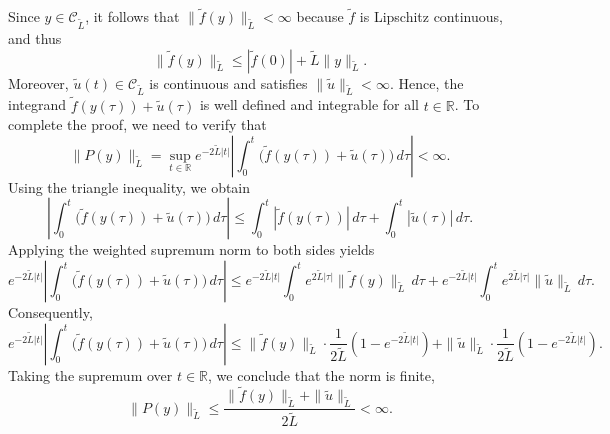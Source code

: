 \documentclass[preprint,12pt]{elsarticle}
\begin{document}
\begin{pf}
Since \( y \in \mathcal{C}_{\tilde L} \), it follows that \( \|\tilde{f}(y)\|_{\tilde L} < \infty \) because \( \tilde{f} \) is Lipschitz continuous, and thus
\[
\|\tilde{f}(y)\|_{\tilde L} \leq |\tilde{f}(0)| + \tilde{L} \|y\|_{\tilde L}.
\]
Moreover, \( \tilde u(t) \in \mathcal{C}_{\tilde L} \) is continuous and satisfies \( \|\tilde u\|_{\tilde L} < \infty \).  
Hence, the integrand \( \tilde{f}(y(\tau)) + \tilde u(\tau) \) is well defined and integrable for all \( t \in \mathbb{R} \).
To complete the proof, we need to verify that
\[
\|P(y)\|_{\tilde L} = \sup_{t \in \mathbb{R}} e^{-2\tilde L |t|} 
\left|\int_0^t \big(\tilde{f}(y(\tau)) + \tilde u(\tau)\big) \, d\tau \right| < \infty.
\]
Using the triangle inequality, we obtain
\[
\left|\int_0^t \big(\tilde{f}(y(\tau)) + \tilde u(\tau)\big) \, d\tau \right| 
\leq \int_0^t |\tilde{f}(y(\tau))| \, d\tau + \int_0^t |\tilde u(\tau)| \, d\tau.
\]
Applying the weighted supremum norm to both sides yields
\[
e^{-2\tilde{L}|t|} \left|\int_0^t \big(\tilde{f}(y(\tau)) + \tilde u(\tau)\big) \, d\tau \right| 
\leq e^{-2\tilde{L}|t|} \int_0^t e^{2\tilde{L}|\tau|} \|\tilde{f}(y)\|_{\tilde L} \, d\tau 
+ e^{-2\tilde{L}|t|} \int_0^t e^{2\tilde{L}|\tau|} \|\tilde u\|_{\tilde L} \, d\tau.
\]
Consequently,
\[
e^{-2\tilde{L}|t|} \left|\int_0^t \big(\tilde{f}(y(\tau)) + \tilde u(\tau)\big) \, d\tau \right|
\leq \|\tilde{f}(y)\|_{\tilde L} \cdot \frac{1}{2\tilde{L}} (1 - e^{-2\tilde{L}|t|}) +\|\tilde u\|_{\tilde L} \cdot \frac{1}{2\tilde{L}} (1 - e^{-2\tilde{L}|t|}).
\]
Taking the supremum over \( t \in \mathbb{R} \), we conclude that the norm is finite,
\[
\|P(y)\|_{\tilde L} \leq \frac{\|\tilde{f}(y)\|_{\tilde L} +\|\tilde u\|_{\tilde L} }{2\tilde{L}} < \infty.
\]
\end{pf} 
\end{document}
